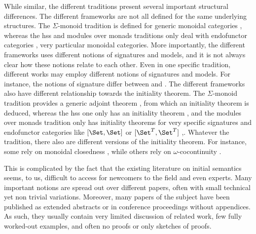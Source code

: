 %
While similar, the different traditions present several important structural differences.
%
The different frameworks are not all defined for the same underlying structures.
The $Σ$-monoid tradition is defined for generic monoidal categories
\cite{SecondOrderDep08}, whereas the hss and modules over monads traditions
only deal with endofunctor categories \cite{Hss04,PresentableSignatures21},
very particular monoidal categories.
%
More importantly, the different frameworks uses different notions of signatures
and models, and it is not always clear how these notions relate to each other.
Even in one specific tradition, different works may employ different notions of signatures and models.
For instance, the notions of signature differ between \cite{HirschowitzMaggesi07,ZsidoPhd10}
and \cite{PresentableSignatures21,2Signatures19}.
%
The different frameworks also have different relationship towards the initiality theorem.
The $Σ$-monoid tradition provides a generic adjoint theorem \cite{SecondOrderDep08},
from which an initiality theorem is deduced, whereas the hss one only has an
initiality theorem \cite{HssRevisited15}, and the modules over monads tradition
only has initiality theorems for very specific signatures and endofunctor categories like
$[\Set,\Set]$ or $[\Set^T,\Set^T]$ \cite{HirschowitzMaggesi10},\cite[Section 6]{ZsidoPhd10}.
%
Whatever the tradition, there also are different versions of the initiality theorem.
For instance, some rely on monoidal closedness \cite{SecondOrderDep08,HssRevisited15},
while others rely on $\omega$-cocontinuity \cite{ListObjects17,HssUntypedUniMath19}.



%
%
This is complicated by the fact that the existing literature on initial semantics
seems, to us, difficult to access for newcomers to the field and even experts.
%
Many important notions are spread out over different papers, often with small
technical yet non trivial variations.
%
Moreover, many papers of the subject have been published
as extended abstracts or in conference proceedings without appendices.
%
As such, they usually contain very limited discussion of related work, few fully worked-out
examples, and often no proofs or only sketches of proofs.


